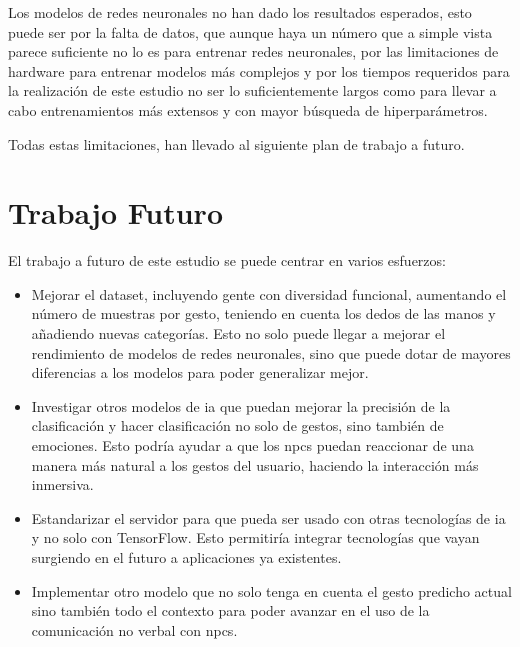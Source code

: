 Los modelos de redes neuronales no han dado los resultados esperados, esto puede ser por la falta de datos, que aunque haya un número que a simple vista parece suficiente no lo es para entrenar redes neuronales, por las limitaciones de hardware para entrenar modelos más complejos y por los tiempos requeridos para la realización de este estudio no ser lo suficientemente largos como para llevar a cabo entrenamientos más extensos y con mayor búsqueda de hiperparámetros.

Todas estas limitaciones, han llevado al siguiente plan de trabajo a futuro.


\section{Trabajo Futuro}

El trabajo a futuro de este estudio se puede centrar en varios esfuerzos:
\begin{itemize}
    \item Mejorar el dataset, incluyendo gente con diversidad funcional, aumentando el número de muestras por gesto, teniendo en cuenta los dedos de las manos y añadiendo nuevas categorías. Esto no solo puede llegar a mejorar el rendimiento de modelos de redes neuronales, sino que puede dotar de mayores diferencias a los modelos para poder generalizar mejor.
    \item Investigar otros modelos de \gls{ia} que puedan mejorar la precisión de la clasificación y hacer clasificación no solo de gestos, sino también de emociones. Esto podría ayudar a que los \glspl{npc} puedan reaccionar de una manera más natural a los gestos del usuario, haciendo la interacción más inmersiva.
    \item Estandarizar el servidor para que pueda ser usado con otras tecnologías de \gls{ia} y no solo con TensorFlow. Esto permitiría integrar tecnologías que vayan surgiendo en el futuro a aplicaciones ya existentes.
    \item Implementar otro modelo que no solo tenga en cuenta el gesto predicho actual sino también todo el contexto para poder avanzar en el uso de la comunicación no verbal con \glspl{npc}.
\end{itemize}



